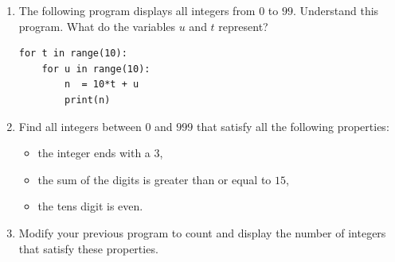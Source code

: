 \documentclass[11pt,class=report,crop=false]{standalone}
\begin{document}
\begin{activite}


\begin{enumerate}
  \item The following program displays all integers from $0$ to $99$. Understand this program. What do the variables $u$ and $t$ represent?
  
\begin{center}
\begin{minipage}{0.5\textwidth}
\begin{lstlisting}
for t in range(10):
    for u in range(10):
        n  = 10*t + u
        print(n)
\end{lstlisting}
\end{minipage} 
\end{center} 
  
  \item Find all integers between $0$ and $999$ that satisfy all the following properties:
  \begin{itemize}
    \item the integer ends with a $3$,
    
    \item the sum of the digits is greater than or equal to $15$,
    
    \item the tens digit is even.
  \end{itemize}
   
  
  \item Modify your previous program to count and display the number of integers that satisfy these properties.
  
\end{enumerate}

\end{activite}



\end{document}

